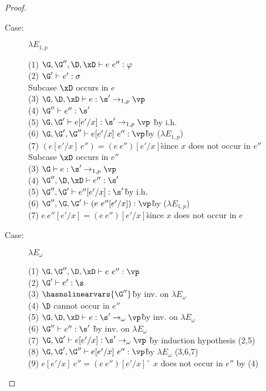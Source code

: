 \begin{proof}
\begin{description}
\item[Case:] $\lambda E_{1,p}$
\begin{tabbing}
    (1) $\G,\G'',\D,\xD \vdash e~e'' : \varphi$\\
    (2) $\G' \vdash e' : \sigma$\\
    Subcase $\xD$ occurs in $e$\\
    (3) $\G,\D,\xD \vdash e : \s' \to_{1,p} \vp$\\
    (4) $\G'' \vdash e'' : \s'$\\
    (5) $\G,\G'\vdash e[e'/x] : \s' \to_{1,p} \vp$ \` by i.h.\\
    (6) $\G,\G',\G'' \vdash e[e'/x]~e'' : \vp$\` by ($\lambda E_{1,p}$)\\
    (7) $(e[e'/x]~e'')=(e~e'')[e'/x]$\` since $x$ does not occur in $e''$\\
    Subcase $\xD$ occurs in $e''$\\
    (3) $\G \vdash e : \s' \to_{1,p} \vp$\\
    (4) $\G'',\D,\xD \vdash e'' : \s'$\\
    (5) $\G'',\G' \vdash e''[e'/x] : \s'$\` by i.h.\\
    (6) $\G'',\G,\G' \vdash (e~e''[e'/x]) : \vp$\` by ($\lambda E_{1,p}$)\\
    (7) $e~e''[e'/x] = (e~e'')[e'/x]$\`since $x$ does not occur in $e$\\

\end{tabbing}

\item[Case:] $\lambda E_\omega$
\begin{tabbing}
    (1) $\G, \G'', \D, \xD \vdash e~e'' : \vp$\\
    (2) $\G' \vdash e' : \s$\\
    (3) $\hasnolinearvars{\G''}$\` by inv. on $\lambda E_\omega$\\
    (4) $\D$ cannot occur in $e''$\\
    (5) $\G, \D, \xD \vdash e : \s' \to_\omega \vp$\` by inv. on $\lambda E_\omega$\\
    (6) $\G'' \vdash e'' : \s'$ \` by inv. on $\lambda E_\omega$\\
    (7) $\G, \G' \vdash e[e'/x] : \s' \to_\omega \vp$ \` by induction hypothesis (2,5)\\
    (8) $\G, \G', \G'' \vdash e[e'/x]~e'' : \vp$\` by $\lambda E_\omega$ (3,6,7)\\
    (9) $e[e'/x]~e'' = (e~e'')[e'/x]$\` $x$ does not occur in $e''$ by (4)\\
\end{tabbing}


\end{description}
\end{proof}
